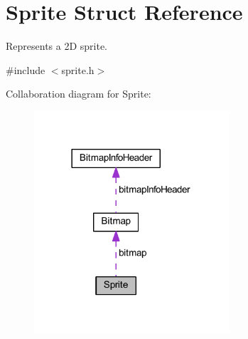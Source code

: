 \hypertarget{struct_sprite}{}\section{Sprite Struct Reference}
\label{struct_sprite}


Represents a 2D sprite.  




{\ttfamily \#include $<$sprite.\+h$>$}



Collaboration diagram for Sprite\+:\nopagebreak
\begin{figure}[H]
\begin{center}
\leavevmode
\includegraphics[width=206pt]{struct_sprite__coll__graph}
\end{center}
\end{figure}
